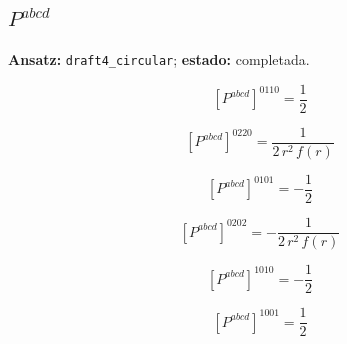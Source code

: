\documentclass[11pt]{article}
\begin{document}
\subsection*{$ P^{abcd} $}
\textbf{Ansatz:} \texttt{draft4\_circular}; \textbf{estado:} completada.\par
\begin{dmath*}[breakdepth={5}]
\left[P^{abcd}\right]^{0110} = \frac{1}{2}
\end{dmath*}
\par\smallskip
\begin{dmath*}[breakdepth={5}]
\left[P^{abcd}\right]^{0220} = \frac{1}{2\,{r}^{2}\,f\!\left(r\right)}
\end{dmath*}
\par\smallskip
\begin{dmath*}[breakdepth={5}]
\left[P^{abcd}\right]^{0101} = -\frac{1}{2}
\end{dmath*}
\par\smallskip
\begin{dmath*}[breakdepth={5}]
\left[P^{abcd}\right]^{0202} = -\frac{1}{2\,{r}^{2}\,f\!\left(r\right)}
\end{dmath*}
\par\smallskip
\begin{dmath*}[breakdepth={5}]
\left[P^{abcd}\right]^{1010} = -\frac{1}{2}
\end{dmath*}
\par\smallskip
\begin{dmath*}[breakdepth={5}]
\left[P^{abcd}\right]^{1001} = \frac{1}{2}
\end{dmath*}
\par\smallskip
\end{document}
